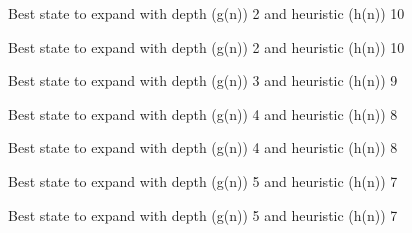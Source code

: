 \documentclass{article}
\begin{document}
{\noindent Best state to expand with depth (g(n)) 2 and heuristic (h(n)) 10\newline}
{}\newline

{\noindent Best state to expand with depth (g(n)) 2 and heuristic (h(n)) 10\newline}
{}\newline

{\noindent Best state to expand with depth (g(n)) 3 and heuristic (h(n)) 9\newline}
{}\newline

{\noindent Best state to expand with depth (g(n)) 4 and heuristic (h(n)) 8\newline}
{}\newline

{\noindent Best state to expand with depth (g(n)) 4 and heuristic (h(n)) 8\newline}
{}\newline

{\noindent Best state to expand with depth (g(n)) 5 and heuristic (h(n)) 7\newline}
{}\newline

{\noindent Best state to expand with depth (g(n)) 5 and heuristic (h(n)) 7\newline}
{}\newline
\end{document}
